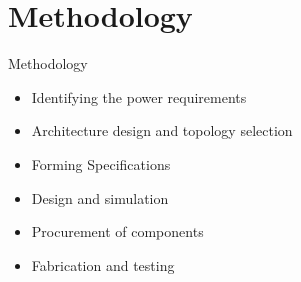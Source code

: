 \documentclass[aspectratio=169]{beamer}
\begin{document}
		\section{Methodology}	
	\begin{frame}{Methodology}
			\begin{itemize}
			
					\item Identifying the power requirements
					\item Architecture design and topology selection
					\item Forming Specifications
			
					\item Design and simulation
					\item Procurement of components
					\item Fabrication and testing
			
				\end{itemize} 
		
		\end{frame}
\end{document}
